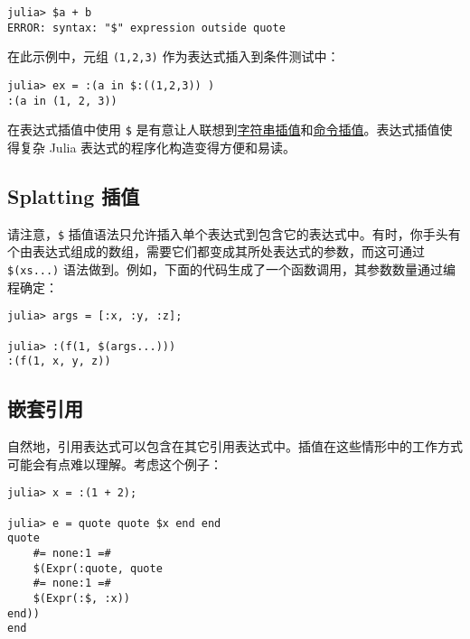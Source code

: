 \begin{verbatim}
julia> $a + b
ERROR: syntax: "$" expression outside quote
\end{verbatim}



在此示例中，元组 \texttt{(1,2,3)} 作为表达式插入到条件测试中：




\begin{verbatim}
julia> ex = :(a in $:((1,2,3)) )
:(a in (1, 2, 3))
\end{verbatim}



在表达式插值中使用 \texttt{\$} 是有意让人联想到\hyperlink{4452850363638134205}{字符串插值}和\hyperlink{3603331931999023419}{命令插值}。表达式插值使得复杂 Julia 表达式的程序化构造变得方便和易读。



\hypertarget{12062767751485347352}{}


\subsection{Splatting 插值}



请注意，\texttt{\$} 插值语法只允许插入单个表达式到包含它的表达式中。有时，你手头有个由表达式组成的数组，需要它们都变成其所处表达式的参数，而这可通过 \texttt{\$(xs...)} 语法做到。例如，下面的代码生成了一个函数调用，其参数数量通过编程确定：




\begin{verbatim}
julia> args = [:x, :y, :z];

julia> :(f(1, $(args...)))
:(f(1, x, y, z))
\end{verbatim}



\hypertarget{15842920146318002847}{}


\subsection{嵌套引用}



自然地，引用表达式可以包含在其它引用表达式中。插值在这些情形中的工作方式可能会有点难以理解。考虑这个例子：




\begin{verbatim}
julia> x = :(1 + 2);

julia> e = quote quote $x end end
quote
    #= none:1 =#
    $(Expr(:quote, quote
    #= none:1 =#
    $(Expr(:$, :x))
end))
end
\end{verbatim}



